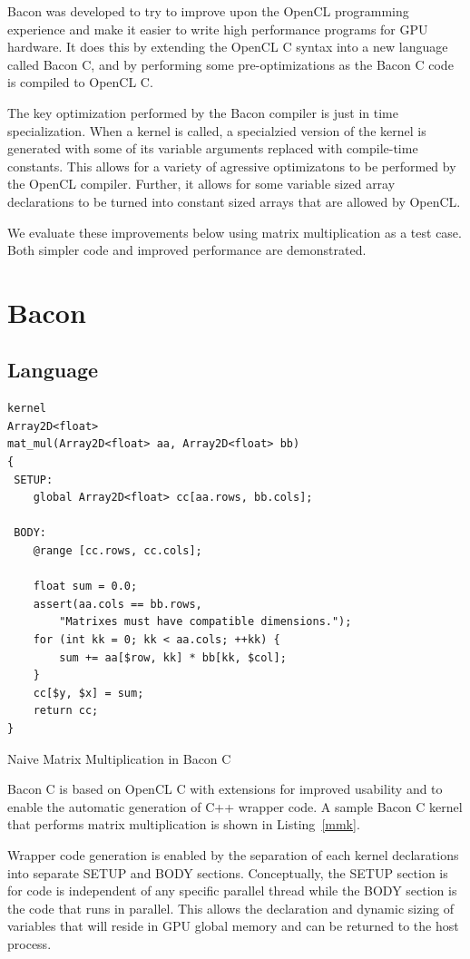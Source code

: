 \documentclass{llncs}
\begin{document}
Bacon was developed to try to improve upon the OpenCL programming
experience and make it easier to write high performance programs for
GPU hardware. It does this by extending the OpenCL C syntax into a new
language called Bacon C, and by performing some pre-optimizations as
the Bacon C code is compiled to OpenCL C.

The key optimization performed by the Bacon compiler is just in time
specialization. When a kernel is called, a specialzied version of the
kernel is generated with some of its variable arguments replaced with
compile-time constants. This allows for a variety of agressive
optimizatons to be performed by the OpenCL compiler. Further, it
allows for some variable sized array declarations to be turned into
constant sized arrays that are allowed by OpenCL.

We evaluate these improvements below using matrix multiplication as a
test case. Both simpler code and improved performance are
demonstrated.

\section{Bacon}
\subsection{Language}

\begin{listing}[tb]
\begin{verbatim}
kernel
Array2D<float>
mat_mul(Array2D<float> aa, Array2D<float> bb) 
{
 SETUP:
    global Array2D<float> cc[aa.rows, bb.cols];

 BODY:
    @range [cc.rows, cc.cols];

    float sum = 0.0;
    assert(aa.cols == bb.rows, 
        "Matrixes must have compatible dimensions.");
    for (int kk = 0; kk < aa.cols; ++kk) {
        sum += aa[$row, kk] * bb[kk, $col];
    }
    cc[$y, $x] = sum;
    return cc;
}
\end{verbatim}
\caption{Naive Matrix Multiplication in Bacon C}\label{mmk}
\end{listing}

Bacon C is based on OpenCL C with extensions for improved usability
and to enable the automatic generation of C++ wrapper code. A sample
Bacon C kernel that performs matrix multiplication is shown in
Listing~\ref{mmk}.

Wrapper code generation is enabled by the separation of each kernel
declarations into separate SETUP and BODY sections. Conceptually, the
SETUP section is for code is independent of any specific parallel
thread while the BODY section is the code that runs in parallel. This
allows the declaration and dynamic sizing of variables that will
reside in GPU global memory and can be returned to the host process.
\end{document}
